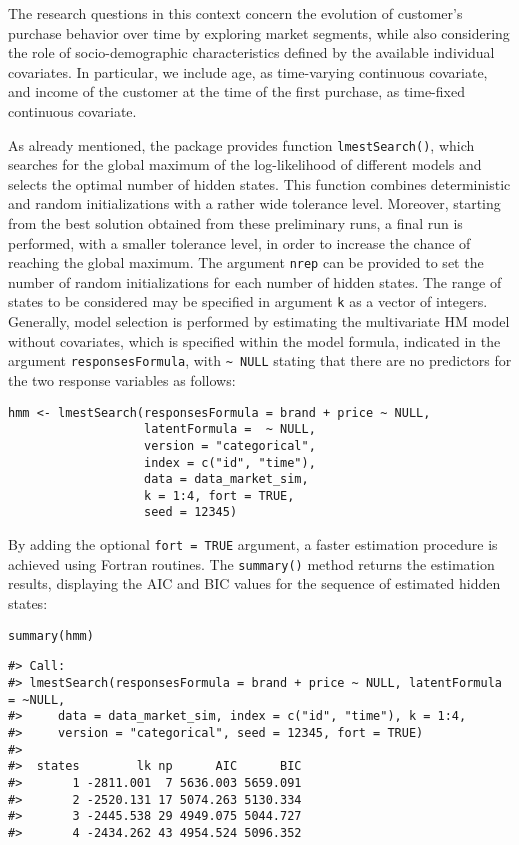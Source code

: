 The research questions in this context concern the evolution of customer's purchase behavior over time by exploring market segments,
while also considering the role of socio-demographic characteristics
defined by the available individual covariates. In particular, we
include age, as time-varying continuous covariate, and income of the
customer at the time of the first purchase, as time-fixed continuous
covariate.

As already mentioned, the package provides function \texttt{lmestSearch()},
which searches for the global maximum of the log-likelihood of different
models and selects the optimal number of hidden states. This function
combines deterministic and random initializations with a rather wide
tolerance level. Moreover, starting from the best solution obtained from
these preliminary runs, a final run is performed, with a smaller
tolerance level, in order to increase the chance of reaching the global
maximum. The argument \texttt{nrep} can be provided to set the number of random
initializations for each number of hidden states. The range of states to
be considered may be specified in argument \texttt{k} as a vector of integers.
Generally, model selection is performed by estimating the multivariate
HM model without covariates, which is specified within the model
formula, indicated in the argument \texttt{responsesFormula}, with \texttt{\textasciitilde{}\ NULL}
stating that there are no predictors for the two response variables as
follows:

\begin{verbatim}
hmm <- lmestSearch(responsesFormula = brand + price ~ NULL,
                   latentFormula =  ~ NULL,
                   version = "categorical",
                   index = c("id", "time"),
                   data = data_market_sim,
                   k = 1:4, fort = TRUE,
                   seed = 12345)
\end{verbatim}

By adding the optional \texttt{fort\ =\ TRUE} argument, a faster estimation
procedure is achieved using Fortran routines. The \texttt{summary()} method
returns the estimation results, displaying the AIC and BIC values for
the sequence of estimated hidden states:

\begin{verbatim}
summary(hmm)
\end{verbatim}

\begin{verbatim}
#> Call:
#> lmestSearch(responsesFormula = brand + price ~ NULL, latentFormula = ~NULL, 
#>     data = data_market_sim, index = c("id", "time"), k = 1:4, 
#>     version = "categorical", seed = 12345, fort = TRUE)
#> 
#>  states        lk np      AIC      BIC
#>       1 -2811.001  7 5636.003 5659.091
#>       2 -2520.131 17 5074.263 5130.334
#>       3 -2445.538 29 4949.075 5044.727
#>       4 -2434.262 43 4954.524 5096.352
\end{verbatim}


